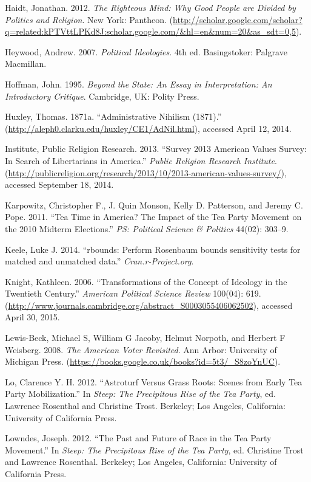 \documentclass[12pt,]{article}
\begin{document}
Haidt, Jonathan. 2012. \emph{The Righteous Mind: Why Good People are
Divided by Politics and Religion}. New York: Pantheon.
(\url{http://scholar.google.com/scholar?q=related:kPTVttLPKd8J:scholar.google.com/\&hl=en\&num=20\&as_sdt=0,5}).

Heywood, Andrew. 2007. \emph{Political Ideologies}. 4th ed.
Basingstoker: Palgrave Macmillan.

Hoffman, John. 1995. \emph{Beyond the State: An Essay in Interpretation:
An Introductory Critique}. Cambridge, UK: Polity Press.

Huxley, Thomas. 1871a. ``Administrative Nihilism (1871).''
(\url{http://aleph0.clarku.edu/huxley/CE1/AdNil.html}), accessed April
12, 2014.

Institute, Public Religion Research. 2013. ``Survey 2013 American Values
Survey: In Search of Libertarians in America.'' \emph{Public Religion
Research Institute}.
(\url{http://publicreligion.org/research/2013/10/2013-american-values-survey/}),
accessed September 18, 2014.

Karpowitz, Christopher F., J. Quin Monson, Kelly D. Patterson, and
Jeremy C. Pope. 2011. ``Tea Time in America? The Impact of the Tea Party
Movement on the 2010 Midterm Elections.'' \emph{PS: Political Science \&
Politics} 44(02): 303--9.

Keele, Luke J. 2014. ``rbounds: Perform Rosenbaum bounds sensitivity
tests for matched and unmatched data.'' \emph{Cran.r-Project.org}.

Knight, Kathleen. 2006. ``Transformations of the Concept of Ideology in
the Twentieth Century.'' \emph{American Political Science Review}
100(04): 619.
(\url{http://www.journals.cambridge.org/abstract_S0003055406062502}),
accessed April 30, 2015.

Lewis-Beck, Michael S, William G Jacoby, Helmut Norpoth, and Herbert F
Weisberg. 2008. \emph{The American Voter Revisited}. Ann Arbor:
University of Michigan Press.
(\url{https://books.google.co.uk/books?id=5t3/_S8zoYnUC}).

Lo, Clarence Y. H. 2012. ``Astroturf Versus Grass Roots: Scenes from
Early Tea Party Mobilization.'' In \emph{Steep: The Precipitous Rise of
the Tea Party}, ed. Lawrence Rosenthal and Christine Trost. Berkeley;
Los Angeles, California: University of California Press.

Lowndes, Joseph. 2012. ``The Past and Future of Race in the Tea Party
Movement.'' In \emph{Steep: The Precipitous Rise of the Tea Party}, ed.
Christine Trost and Lawrence Rosenthal. Berkeley; Los Angeles,
California: University of California Press.
\end{document}
